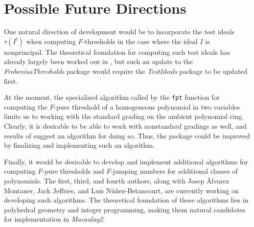 \documentclass{amsart}
\begin{document}
\section{Possible Future Directions}
\label{sec.FutureDirections}

One natural direction of development would be to  incorporate the test ideals $\tau(I^t)$ when computing $F$-thresholds in the case where the ideal $I$ is nonprincipal.
The theoretical foundation for computing such test ideals has already largely been worked out in \cite{SchwedeTuckerTestIdealsOfNonPrincipal}, but such an update to the \emph{FrobeniusThresholds} package would require the  \emph{TestIdeals} package to be updated first.

At the moment, the specialized algorithm called by the \texttt{fpt} function for computing the $F$-pure threshold of a homogeneous polynomial in two variables limits us to working with the standard grading on the ambient polynomial ring.  Clearly, it is desirable to be able to work with nonstandard gradings as well, and results of \cite{HernandezTeixeiraFThresholdFunctions} suggest an algorithm for doing so.  Thus, the package could be improved by finalizing and implementing such an algorithm.

Finally, it would be desirable to develop and implement additional algorithms for computing $F$-pure thresholds and $F$-jumping numbers for additional classes of polynomials.  The first, third, and fourth authors, along with Josep \'Alvarez Montaner, Jack Jeffries, and Luis N\'u\~nez-Betancourt,  are currently working on developing such algorithms.  The theoretical foundation of these algorithms lies in polyhedral geometry and integer programming, making them natural candidates for  implementation in \emph{Macaulay2}.  




\end{document}
